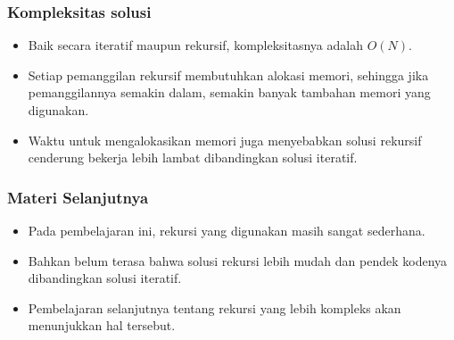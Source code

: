 \begin{frame}
\frametitle{Kompleksitas solusi}
\begin{itemize}
  \item Baik secara iteratif maupun rekursif, kompleksitasnya adalah $O(N)$.
  \item Setiap pemanggilan rekursif membutuhkan alokasi memori, sehingga jika pemanggilannya semakin dalam, semakin banyak tambahan memori yang digunakan.
  \item Waktu untuk mengalokasikan memori juga menyebabkan solusi rekursif cenderung bekerja lebih lambat dibandingkan solusi iteratif.
\end{itemize}
\end{frame}

\begin{frame}
\frametitle{Materi Selanjutnya}
\begin{itemize}
  \item Pada pembelajaran ini, rekursi yang digunakan masih sangat sederhana.
  \item Bahkan belum terasa bahwa solusi rekursi lebih mudah dan pendek kodenya dibandingkan solusi iteratif.
  \item Pembelajaran selanjutnya tentang rekursi yang lebih kompleks akan menunjukkan hal tersebut.
\end{itemize}
\end{frame}


